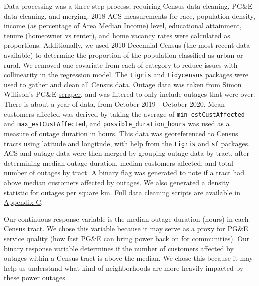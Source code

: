 \documentclass[
]{article}
\begin{document}
Data processing was a three step process, requiring Census data
cleaning, PG\&E data cleaning, and merging. 2018 ACS measurements for
race, population density, income (as percentage of Area Median Income)
level, educational attainment, tenure (homeowner vs renter), and home
vacancy rates were calculated as proportions. Additionally, we used 2010
Decennial Census (the most recent data available) to determine the
proportion of the population classified as urban or rural. We removed
one covariate from each of category to reduce issues with collinearity
in the regression model. The \texttt{tigris} and \texttt{tidycensus}
packages were used to gather and clean all Census data. Outage data was
taken from Simon Willison's PG\&E
\href{https://simonwillison.net/2019/Oct/10/pge-outages/}{scraper}, and
was filtered to only include outages that were over. There is about a
year of data, from October 2019 - October 2020. Mean customers affected
was derived by taking the average of \texttt{min\_estCustAffected} and
\texttt{max\_estCustAffected}, and \texttt{possible\_duration\_hours}
was used as a measure of outage duration in hours. This data was
georeferenced to Census tracts using latitude and longitude, with help
from the \texttt{tigris} and \texttt{sf} packages. ACS and outage data
were then merged by grouping outage data by tract, after determining
median outage duration, median customers affected, and total number of
outages by tract. A binary flag was generated to note if a tract had
above median customers affected by outages. We also generated a density
statistic for outages per square km. Full data cleaning scripts are
available in \protect\hyperlink{appendixC}{Appendix C}.

Our continuous response variable is the median outage duration (hours)
in each Census tract. We chose this variable because it may serve as a
proxy for PG\&E service quality (how fast PG\&E can bring power back on
for communities). Our binary response variable determines if the number
of customers affected by outages within a Census tract is above the
median. We chose this because it may help us understand what kind of
neighborhoods are more heavily impacted by these power outages.
\end{document}
